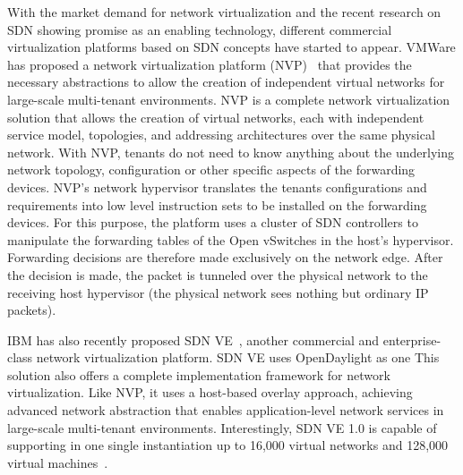 With the market demand for network virtualization and the recent research on SDN showing promise as an enabling technology, different commercial virtualization platforms based on SDN concepts have started to appear.
VMWare has proposed a network virtualization platform (NVP)~\cite{koponen} that provides the necessary abstractions to allow the creation of independent virtual networks for large-scale multi-tenant environments.
NVP is a complete network virtualization solution that allows the creation of virtual networks, each with independent service model, topologies, and addressing architectures over the same physical network.
With NVP, tenants do not need to know anything about the underlying network topology, configuration or other specific aspects of the forwarding devices. 
NVP's network hypervisor translates the tenants configurations and requirements into low level instruction sets to be installed on the forwarding devices. 
For this purpose, the platform uses a cluster of SDN controllers to manipulate the forwarding tables of the Open vSwitches in the host's hypervisor. 
Forwarding decisions are therefore made exclusively on the network edge.
After the decision is made, the packet is tunneled over the physical network to the receiving host hypervisor (the physical network sees nothing but ordinary IP packets).

IBM has also recently proposed SDN VE~\cite{racherla2014,li2014}, another commercial and enterprise-class network virtualization platform.
SDN VE uses OpenDaylight as one 
This solution also offers a complete implementation framework for network virtualization. 
Like NVP, it uses a host-based overlay approach, achieving advanced network abstraction that enables application-level network services in large-scale multi-tenant environments. 
Interestingly, SDN VE 1.0 is capable of supporting in one single instantiation up to 16,000 virtual networks and 128,000 virtual machines~\cite{racherla2014,li2014}.

